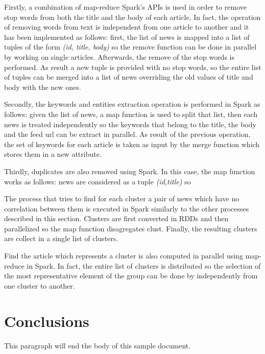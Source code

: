 \documentclass{acm_proc_article-sp}
\begin{document}

Firstly, a combination of map-reduce Spark's APIs is used in order to remove stop words from both the title and the body of each article. In fact, the operation of removing words from text is independent from one article to another and it has been implemented as follows: first, the list of news is mapped into a list of tuples of the form \textit{(id, title, body)} so the remove function can be done in parallel by working on single articles. Afterwards, the remove of the stop words is performed. As result a new tuple is provided with no stop words, so the entire list of tuples can be merged into a list of news overriding the old values of title and body with the new ones.



Secondly, the keywords and entities extraction operation is performed in Spark as follows: given the list of news, a map function is used to split that list, then each news is treated independently so the keywords that belong to the title, the body and the feed url can be extract in parallel. As result of the previous operation, the set of keywords for each article is taken as input by the merge function which stores them in a new attribute.

Thirdly, duplicates are also removed using Spark. In this case, the map function works as follows: news are considered as a tuple \textit{(id,title)} so

The process that tries to find for each cluster a pair of news which have no correlation between them is executed in Spark similarly to the other processes described in this section. Clusters are first converted in RDDs and then parallelized so the map function disagregates clust. Finally, the resulting clusters are collect in a single list of clusters.

Find the article which represents a cluster is also computed in parallel using map-reduce in Spark. In fact, the entire list of clusters is distributed so the selection of the most representative element of the group can be done by independently from one cluster to another.

\section{Conclusions}
This paragraph will end the body of this sample document.




\balancecolumns
\end{document}
